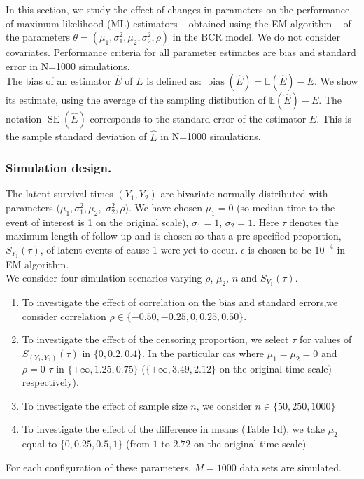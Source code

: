 \documentclass[twoside,a4paper,12pt]{article}
\newcommand{\EE}{\mathbb{E}}
\renewcommand{\hat}{\widehat}
\def\SE{\operatorname{SE}}
\def\bias{\operatorname{bias}}
\theoremstyle{plain}
\theoremstyle{definition}
\begin{document}
In this section, we study the effect of changes in parameters on the performance of maximum likelihood (ML) estimators -- obtained using the EM algorithm -- of 
the parameters $\theta=(\mu_{1},\sigma_{1}^2, \mu_{2},\sigma_{2}^2, \rho)$ in the BCR model. 
We do not consider covariates. Performance criteria for all parameter estimates are bias and standard error in N=1000 simulations.\\

The bias of an estimator $\hat{E}$ of $E$ is defined as: $\bias(\hat{E}) 
=\EE(\hat{E})-E$. We show its estimate, using the average of the sampling distibution of $\EE(\hat{E})-E$.
The notation $\SE(\hat{E})$ corresponds to the standard error of the estimator $\hat{E}$.
This is the sample standard deviation of $\hat{E}$ in N=1000 simulations.
\\

\subsubsection{Simulation design.} 
The latent survival times $(Y_1,Y_2)$ are bivariate normally 
distributed with parameters $(\mu_{1},\sigma_{1}^2,\mu_{2},$ $\sigma_{2}^2,\rho)$. 
We have chosen $\mu_1=0$ (so median time to the event of interest is 1 on the original scale), 
$\sigma_1=1$, $\sigma_2=1$. 
Here $\tau$ denotes the maximum length of follow-up and is chosen so that 
a pre-specified proportion, $S_{Y_1}(\tau)$, of latent events of cause 1 were yet to occur. 
$\epsilon$ is chosen to be $10^{-4}$ in EM algorithm. 
\\

We consider four simulation scenarios varying $\rho$, $\mu_{2}$, $n$ and 
$S_{Y_1}(\tau)$. 
\begin{enumerate}[label=(\roman*)]
\item To investigate the effect of correlation on the bias and standard  errors,we consider  correlation $\rho \in \{-0.50, -0.25, 0, 0.25, 0.50\}$.
\item  To investigate the effect of the censoring proportion, we select $\tau$ for values of $S_{(Y_1,Y_2)}(\tau)$ in $\{0, 0.2, 0.4\}$. In the particular cas where $\mu_1=\mu_2=0$ and $\rho=0$ $\tau$ in $\{+\infty, 1.25, 0.75\}$ ($\{+\infty, 3.49, 2.12\}$ on the original time scale) respectively). 
\item To investigate the effect of sample size $n$, we consider $n \in \{50, 250, 1000\}$
\item  To investigate the effect of the difference in means (Table 1d), we take $\mu_{2}$ 
equal to $\{0, 0.25, 0.5, 1\}$ (from $1$ to $2.72$ on the original time scale)
\end{enumerate}
For each configuration of these parameters, $M=1000$ data sets are simulated.
\end{document}
